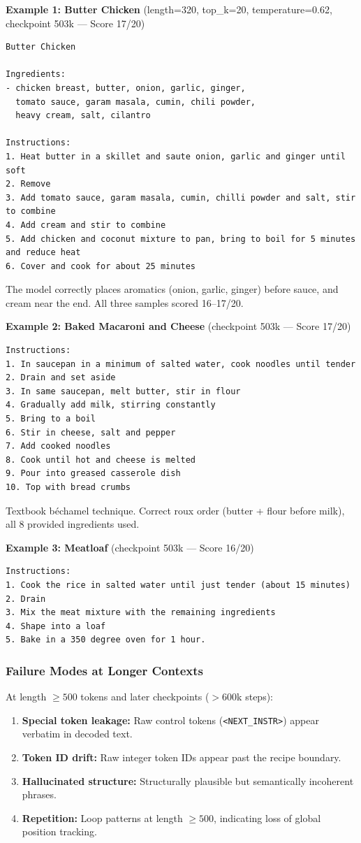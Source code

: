 \documentclass[11pt,a4paper]{article}
\begin{document}
\textbf{Example 1: Butter Chicken} (length=320, top\_k=20, temperature=0.62, checkpoint 503k --- Score 17/20)

\begin{lstlisting}
Butter Chicken

Ingredients:
- chicken breast, butter, onion, garlic, ginger,
  tomato sauce, garam masala, cumin, chili powder,
  heavy cream, salt, cilantro

Instructions:
1. Heat butter in a skillet and saute onion, garlic and ginger until soft
2. Remove
3. Add tomato sauce, garam masala, cumin, chilli powder and salt, stir to combine
4. Add cream and stir to combine
5. Add chicken and coconut mixture to pan, bring to boil for 5 minutes and reduce heat
6. Cover and cook for about 25 minutes
\end{lstlisting}

The model correctly places aromatics (onion, garlic, ginger) before sauce, and cream near the end. All three samples scored 16--17/20.

\textbf{Example 2: Baked Macaroni and Cheese} (checkpoint 503k --- Score 17/20)

\begin{lstlisting}
Instructions:
1. In saucepan in a minimum of salted water, cook noodles until tender
2. Drain and set aside
3. In same saucepan, melt butter, stir in flour
4. Gradually add milk, stirring constantly
5. Bring to a boil
6. Stir in cheese, salt and pepper
7. Add cooked noodles
8. Cook until hot and cheese is melted
9. Pour into greased casserole dish
10. Top with bread crumbs
\end{lstlisting}

Textbook b\'echamel technique. Correct roux order (butter + flour before milk), all 8 provided ingredients used.

\textbf{Example 3: Meatloaf} (checkpoint 503k --- Score 16/20)

\begin{lstlisting}
Instructions:
1. Cook the rice in salted water until just tender (about 15 minutes)
2. Drain
3. Mix the meat mixture with the remaining ingredients
4. Shape into a loaf
5. Bake in a 350 degree oven for 1 hour.
\end{lstlisting}

\subsubsection*{Failure Modes at Longer Contexts}

At length $\geq 500$ tokens and later checkpoints ($> 600$k steps):
\begin{enumerate}[nosep]
  \item \textbf{Special token leakage:} Raw control tokens (\texttt{<NEXT\_INSTR>}) appear verbatim in decoded text.
  \item \textbf{Token ID drift:} Raw integer token IDs appear past the recipe boundary.
  \item \textbf{Hallucinated structure:} Structurally plausible but semantically incoherent phrases.
  \item \textbf{Repetition:} Loop patterns at length $\geq 500$, indicating loss of global position tracking.
\end{enumerate}
\end{document}

